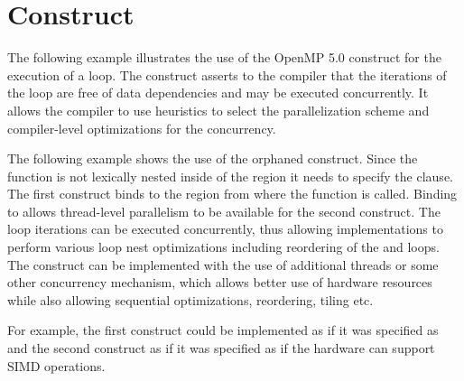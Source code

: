 \section{ Construct}
\label{sec:loop}

The following example illustrates the use of the OpenMP 5.0 
construct for the execution of a loop.
The  construct asserts to the compiler that the iterations 
of the loop are free of data dependencies and may be executed concurrently.
It allows the compiler to use heuristics to select the parallelization scheme
and compiler-level optimizations for the concurrency. 


The following example shows the use of the orphaned  construct. Since the 
function  is not lexically nested inside of the  region it needs to specify 
the  clause. The first  construct binds to the  region 
from where the function  is called. Binding to  allows thread-level 
parallelism to be available for the second  construct.
The loop iterations can be executed concurrently, 
thus allowing implementations to perform various loop nest optimizations including
reordering of the   and  loops. The  construct can be implemented 
with the use of additional threads or some other concurrency mechanism, which allows better use of hardware resources while also allowing sequential optimizations, reordering, tiling etc.

For example, the first  construct could be implemented as if it was specified as 
 and the second  construct as if it was specified as 
 if the hardware can support SIMD operations.

